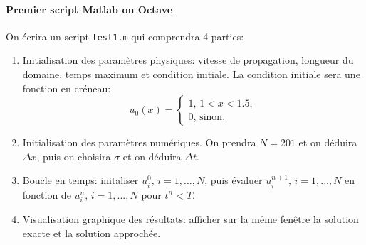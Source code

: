 \documentclass[12pt,a4paper]{article}
\begin{document}
\paragraph{Premier script Matlab ou Octave} On \'ecrira un script \texttt{test1.m} qui comprendra 4 parties:
\begin{enumerate}
\item Initialisation des param\`etres physiques: vitesse de propagation, longueur du domaine, temps maximum et condition initiale. La condition initiale sera une fonction en cr\'eneau:
$$
u_0(x)=\left\{\begin{array}{l} 1,\,1<x<1.5,\\0,\,\mbox{sinon}.\end{array}\right.
$$
\item Initialisation des param\`etres num\'eriques. On prendra $N=201$ et on d\'eduira $\Delta x$, puis on choisira $\sigma$ et on d\'eduira $\Delta t$.
\item Boucle en temps: initaliser $u_i^0,\, i=1,...,N$, puis \'evaluer
  $u_i^{n+1},\, i=1,..., N$ en fonction de $u_i^n,\, i=1,...,N$ pour $t^n<T$.
\item Visualisation graphique des r\'esultats: afficher sur la m\^eme fen\^etre la solution exacte et la solution approch\'ee.
\end{enumerate}
\end{document}
